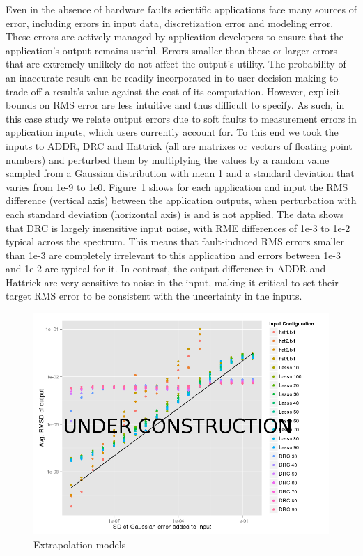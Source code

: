 \documentclass[10pt, conference, compsocconf]{IEEEtran}
\begin{document}
Even in the absence of hardware faults scientific applications face many sources of error, including errors in input data, discretization error and modeling error.
These errors are actively managed by application developers to ensure that the application's output remains useful.
Errors smaller than these or larger errors that are extremely unlikely do not affect the output's utility.
The probability of an inaccurate result can be readily incorporated in to user decision making to trade off a result's value against the cost of its computation.
However, explicit bounds on RMS error are less intuitive and thus difficult to specify.
As such, in this case study we relate output errors due to soft faults to measurement errors in application inputs, which users currently account for.
To this end we took the inputs to ADDR, DRC and Hattrick (all are matrixes or vectors of floating point numbers) and perturbed them by multiplying the values by a random value sampled from a Gaussian distribution with mean 1 and a standard deviation that varies from 1e-9 to 1e0.
Figure~\ref{fig:inputvarianceoutputrmsd} shows for each application and input the RMS difference (vertical axis) between the application outputs, when perturbation with each standard deviation (horizontal axis) is and is not applied.
The data shows that DRC is largely insensitive input noise, with RME differences of 1e-3 to 1e-2 typical across the spectrum.
This means that fault-induced RMS errors smaller than 1e-3 are completely irrelevant to this application and errors between 1e-3 and 1e-2 are typical for it.
In contrast, the output difference in ADDR and Hattrick are very sensitive to noise in the input, making it critical to set their target RMS error to be consistent with the uncertainty in the inputs.

\begin{figure}[ht!]
\centering
\includegraphics[width=1.00\columnwidth]{figs/InputVarianceOutputRMSD.png}
\caption{Extrapolation models}
\label{fig:inputvarianceoutputrmsd}
\end{figure}
\end{document}
